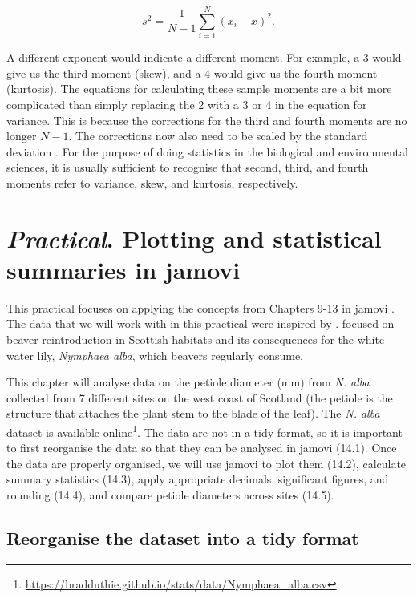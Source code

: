 \documentclass[
  openany]{krantz}
\begin{document}
\[s^{2} = \frac{1}{N - 1}\sum_{i = 1}^{N}\left(x_{i} - \bar{x} \right)^{2}.\]

A different exponent would indicate a different moment.
For example, a 3 would give us the third moment (skew), and a 4 would give us the fourth moment (kurtosis).
The equations for calculating these sample moments are a bit more complicated than simply replacing the 2 with a 3 or 4 in the equation for variance.
This is because the corrections for the third and fourth moments are no longer \(N - 1\).
The corrections now also need to be scaled by the standard deviation \citep[for details, see][]{Sokal1995}.
For the purpose of doing statistics in the biological and environmental sciences, it is usually sufficient to recognise that second, third, and fourth moments refer to variance, skew, and kurtosis, respectively.

\hypertarget{Chapter_14}{%
\chapter{\texorpdfstring{\emph{Practical}. Plotting and statistical summaries in jamovi}{Practical. Plotting and statistical summaries in jamovi}}\label{Chapter_14}}

This practical focuses on applying the concepts from Chapters 9-13 in jamovi \citep{Jamovi2022}.
The data that we will work with in this practical were inspired by \citet{Law2014}.
\citet{Law2014} focused on beaver reintroduction in Scottish habitats and its consequences for the white water lily, \emph{Nymphaea alba}, which beavers regularly consume.

This chapter will analyse data on the petiole diameter (mm) from \emph{N. alba} collected from 7 different sites on the west coast of Scotland (the petiole is the structure that attaches the plant stem to the blade of the leaf).
The \emph{N. alba} dataset is available online\footnote{\url{https://bradduthie.github.io/stats/data/Nymphaea_alba.csv}}.
The data are not in a tidy format, so it is important to first reorganise the data so that they can be analysed in jamovi (14.1).
Once the data are properly organised, we will use jamovi to plot them (14.2), calculate summary statistics (14.3), apply appropriate decimals, significant figures, and rounding (14.4), and compare petiole diameters across sites (14.5).

\hypertarget{reorganise-the-dataset-into-a-tidy-format}{%
\section{Reorganise the dataset into a tidy format}\label{reorganise-the-dataset-into-a-tidy-format}}
\end{document}
